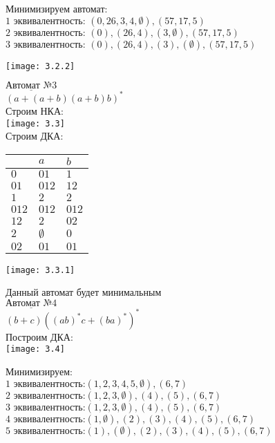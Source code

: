 \documentclass[14pt]{extreport}
\begin{document}
Минимизируем автомат: \\
$\text{1 эквивалентность: }(0,26,3,4,\emptyset),(57,17,5)$\\
$\text{2 эквивалентность: } (0),(26,4),(3,\emptyset),(57,17,5)$\\
$\text{3 эквивалентность: } (0),(26,4),(3),(\emptyset),(57,17,5)$

\texttt{[image: 3.2.2]}

$\underline{\text{Автомат №3}}$\\
$(a + (a + b) (a + b)b)^* $\\

Строим НКА: \\

\texttt{[image: 3.3]}\\

Строим ДКА: \\

\begin{table}[h!]
	\centering
    \begin{tabular}{l | l | l |}
    \hline
     & $a$ & $b$ \\ \hline
    $0$ & $01$ & $1$ \\ \hline
    $01$ & $012$ & $12$ \\ \hline
    $1$ & $2$ & $2$ \\ \hline
    $012$ & $012$ & $012$ \\ \hline
    $12$ & $2$ & $02$ \\ \hline
    $2$ & $\emptyset$ & $0$ \\ \hline
    $02$ & $01$ & $01$ \\ 
    \hline
    \end{tabular}
\end{table}

\texttt{[image: 3.3.1]}

Данный автомат будет минимальным\\

$\underline{\text{Автомат №4}}$\\
$(b + c)((ab)^*c + (ba)^* )^* $\\

Построим ДКА: \\

\texttt{[image: 3.4]}

Минимизируем:\\
$\text{1 эквивалентность:} (1,2,3,4,5,\emptyset),(6,7) $\\
$\text{2 эквивалентность:} (1,2,3,\emptyset),(4),(5),(6,7) $\\
$\text{3 эквивалентность:} (1,2,3,\emptyset),(4),(5),(6,7) $\\
$\text{4 эквивалентность:} (1,\emptyset),(2),(3),(4),(5),(6,7) $\\
$\text{5 эквивалентность:} (1),(\emptyset),(2),(3),(4),(5),(6,7) $\\
\end{document}
